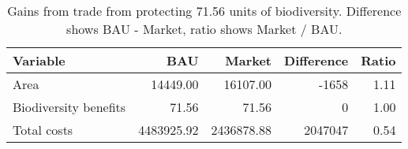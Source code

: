 \begin{table}

\caption{\label{tab:gains-from-trade}Gains from trade from protecting 71.56 units of biodiversity. Difference shows BAU - Market, ratio shows Market / BAU.}
\centering
\begin{tabular}[t]{l|r|r|r|r}
\hline
Variable & BAU & Market & Difference & Ratio\\
\hline
Area & 14449.00 & 16107.00 & -1658 & 1.11\\
\hline
Biodiversity benefits & 71.56 & 71.56 & 0 & 1.00\\
\hline
Total costs & 4483925.92 & 2436878.88 & 2047047 & 0.54\\
\hline
\end{tabular}
\end{table}
